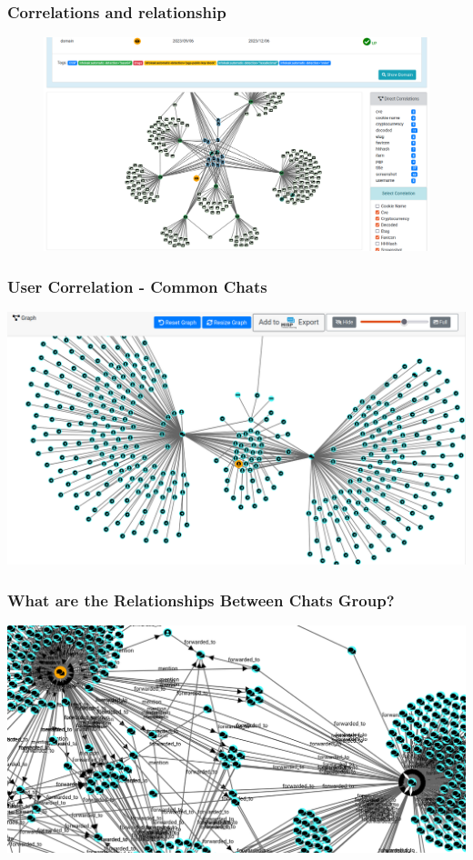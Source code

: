 \documentclass[10pt,aspectratio=169, colorlinks=true, linkcolor=circlBlue]{beamer}
\begin{document}
\begin{frame}
    \frametitle{Correlations and relationship}
    \begin{figure}
        \includegraphics[scale=0.23, angle=0]{screenshot/ail-correlation.png}
    \end{figure}
\end{frame}

\begin{frame}
    \frametitle{User Correlation - Common Chats}
    \begin{center}
        \includegraphics[scale=0.26]{screenshot/chat_users_correlation.png}
    \end{center}
\end{frame}

\begin{frame}
    \frametitle{What are the Relationships Between Chats Group?}
    \begin{center}
        \includegraphics[scale=0.27]{screenshot/noname-relationships.png}
    \end{center}
\end{frame}
\end{document}
